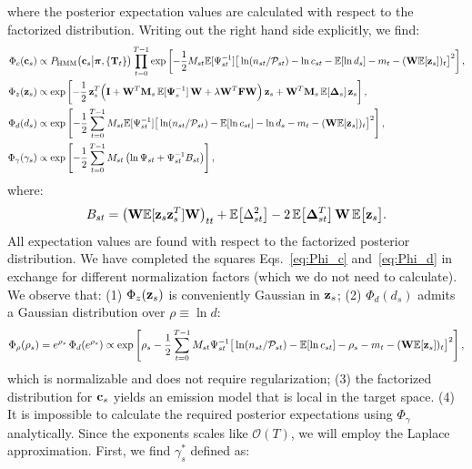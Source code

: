 \documentclass[nofootinbib,amssymb,amsmath]{revtex4}
\newcommand{\vI}{{\bf I}}
\newcommand{\vc}{{\bf c}}
\newcommand{\vz}{{\bf z}}
\newcommand{\vM}{{\bf M}}
\newcommand{\vW}{{\bf W}}
\newcommand{\vF}{{\bf F}}
\newcommand{\vPsi}{{\bf \Psi}}
\newcommand{\vDelta}{{\bf \Delta}}
\newcommand{\vpi}{{\boldsymbol \pi}}
\newcommand{\PP}{\mathcal{P}}
\newcommand{\EE}{\mathbb{E}}
\begin{document}
where the posterior expectation values are calculated with respect to the factorized distribution. Writing out the right hand side explicitly, we find:
\begin{subequations}
\begin{align}
\label{eq:Phi_c}
\Phi_c(\vc_s) &\propto P_\mathrm{HMM}\big(\vc_s \big|\vpi, \{\mathbf{T}_t\}\big)\prod_{t=0}^{T-1} \exp\left[- \frac{1}{2} M_{st}\EE[\Psi_{st}^{-1}]\big[\ln(n_{st}/\PP_{st}) - \ln c_{st} - \EE[\ln d_s] - m_t - (\vW \EE[\vz_s])_t\big]^2\right],\\
\label{eq:Phi_z}
\Phi_z(\vz_s) &\propto \exp\left[-\frac{1}{2} \, \vz_s^T \Big(\vI + \vW^T \vM_s \, \EE[\vPsi_s^{-1}] \, \vW + \lambda \vW^T \vF \vW \Big)\,\vz_s + \vW^T \vM_{s} \, \EE[\mathbf{\Delta}_{s}]\,\vz_s \right],\\
\label{eq:Phi_d}
\Phi_d(d_s) &\propto \exp\left[- \frac{1}{2} \sum_{t=0}^{T-1} M_{st}\EE[\Psi_{st}^{-1}]\big[\ln(n_{st}/\PP_{st}) - \EE[\ln c_{st}] - \ln d_s - m_t - (\vW \EE[\vz_s])_t\big]^2\right],\\
\label{eq:Phi_gamma}
\Phi_\gamma(\gamma_s) &\propto \exp\left[-\frac{1}{2}\sum_{t=0}^{T-1} M_{st} \left( \ln \Psi_{st} + \Psi_{st}^{-1} B_{st} \right)\right],
\end{align}
\end{subequations}
where:
\begin{equation}
\label{eq:B_def}
B_{st} = \big(\vW \EE[\vz_s \vz_s^T] \vW\big)_{tt} + \EE\big[\Delta_{st}^2\big] - 2 \, \EE\big[\vDelta_{st}^T\big] \, \vW \, \EE\big[\vz_s\big].
\end{equation}
All expectation values are found with respect to the factorized posterior distribution. We have completed the squares Eqs.~\eqref{eq:Phi_c} and~\eqref{eq:Phi_d} in exchange for different normalization factors (which we do not need to calculate). We observe that: (1) $\Phi_z(\vz_s)$ is conveniently Gaussian in $\vz_s$; (2) $\Phi_d(d_s)$ admits a Gaussian distribution over $\rho \equiv \ln d$:
\begin{equation}
\Phi_\rho(\rho_s) = e^{\rho_s}\,\Phi_d(e^{\rho_s}) \propto \exp\left[ \rho_s - \frac{1}{2} \sum_{t=0}^{T-1} M_{st}\Psi_{st}^{-1}\big[\ln(n_{st}/\PP_{st}) - \EE[\ln c_{st}] - \rho_s - m_t - (\vW \EE[\vz_s])_t\big]^2\right],
\end{equation}
which is normalizable and does not require regularization; (3) the factorized distribution for $\vc_s$ yields an emission model that is local in the target space. (4) It is impossible to calculate the required posterior expectations using $\Phi_\gamma$ analytically. Since the exponents scales like $\mathcal{O}(T)$, we will employ the Laplace approximation. First, we find $\gamma^*_s$ defined as:
\end{document}
